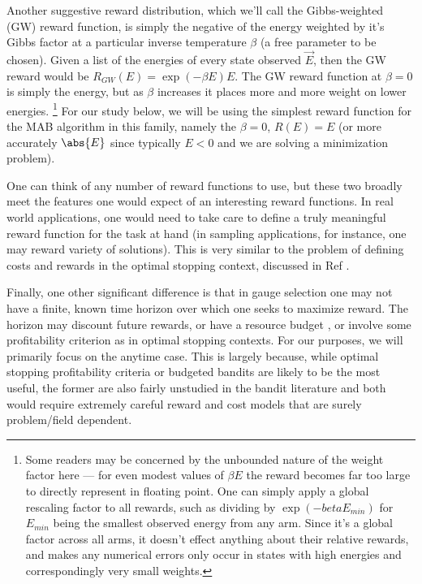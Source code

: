 Another suggestive reward distribution, which we'll call the Gibbs-weighted (GW) reward function, is simply the negative of the energy weighted by it's Gibbs factor at a particular inverse temperature $\beta$ (a free parameter to be chosen). Given a list of the energies of every state observed $\vec{E}$, then the GW reward would be $R_{GW}(E)=\exp(-\beta E) E$. The GW reward function at $\beta=0$ is simply the energy, but as $\beta$ increases it places more and more weight on lower energies. \footnote{Some readers may be concerned by the unbounded nature of the weight factor here --- for even modest values of $\beta E$ the reward becomes far too large to directly represent in floating point. One can simply apply a global rescaling factor to all rewards, such as dividing by $\exp(-beta E_{min})$ for $E_{min}$ being the smallest observed energy from any arm. Since it's a global factor across all arms, it doesn't effect anything about their relative rewards, and makes any numerical errors only occur in states with high energies and correspondingly very small weights.} For our study below, we will be using the simplest reward function for the MAB algorithm in this family, namely the $\beta=0$, $R(E)=E$ (or more accurately $\abs{E}$ since typically $E<0$ and we are solving a minimization problem).

One can think of any number of reward functions to use, but these two broadly meet the features one would expect of an interesting reward functions. In real world applications, one would need to take care to define a truly meaningful reward function for the task at hand (in sampling applications, for instance, one may reward variety of solutions). This is very similar to the problem of defining costs and rewards in the optimal stopping context, discussed in Ref \cite{vinci2016optimally}.

Finally, one other significant difference is that in gauge selection one may not have a finite, known time horizon over which one seeks to maximize reward. The horizon may discount future rewards, or have a resource budget \cite{budgetedthompsonbandits,infinitelybudgetedbandits}, or involve some profitability criterion as in optimal stopping contexts. For our purposes, we will primarily focus on the anytime case. This is largely because, while optimal stopping profitability criteria or budgeted bandits are likely to be the most useful, the former are also fairly unstudied in the bandit literature and both would require extremely careful reward and cost models that are surely problem/field dependent.

